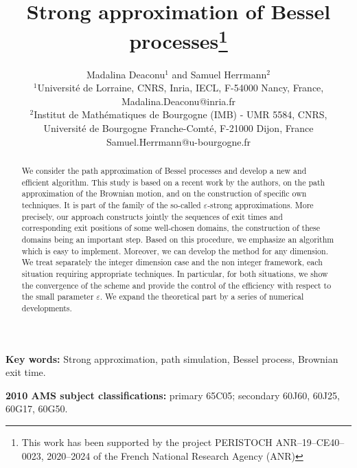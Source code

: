 \documentclass[12pt]{article}
\title{Strong approximation of Bessel processes\protect\thanks{This work has been supported by the project PERISTOCH ANR–19–CE40–0023, 2020--2024 of the French National Research Agency (ANR)}}
\numberwithin{equation}{section}
\begin{document}
\author{Madalina Deaconu$^1$ and Samuel Herrmann$^2$
\\[5pt]
\small {$^1$Universit\'e de Lorraine, CNRS, Inria, IECL, F-54000 Nancy, France,}\\
\small{Madalina.Deaconu@inria.fr}\\[5pt]
\small{$^2$Institut de Math{\'e}matiques de Bourgogne (IMB) - UMR 5584, CNRS,}\\
\small{Universit{\'e} de Bourgogne Franche-Comt\'e, F-21000 Dijon, France} \\
\small{Samuel.Herrmann@u-bourgogne.fr}
}


\maketitle

\begin{abstract}


 We consider the path approximation of Bessel processes and develop a new and efficient algorithm. This study is based on a recent work by the authors, on the path approximation of the Brownian motion, and on the construction of specific own techniques. It is part of the family of the so-called $\varepsilon$-strong approximations. More precisely, our approach constructs jointly the sequences of exit times and corresponding exit positions of some well-chosen domains, the construction of these domains being an important step. Based on this procedure, we emphasize an algorithm which is easy to implement. Moreover, we can develop the method for any dimension.  We treat separately the integer dimension case and the non integer framework, each situation requiring appropriate techniques. In particular, for both situations, we show the convergence of the scheme and provide the control of the efficiency with respect to the small parameter  $\varepsilon$. We expand the theoretical part by a series of numerical developments. 
 
\end{abstract}
{\small
\noindent \textbf{Key words:} Strong approximation, path simulation, Bessel process, Brownian exit time.
\par\medskip

\noindent \textbf{2010 AMS subject classifications:} primary 
65C05;   	%
secondary 
60J60,       %
60J25,  	%
60G17,      %
60G50.  	%
} 	
\end{document}
